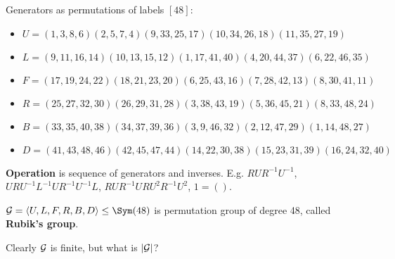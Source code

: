 \begin{slide}
    Generators as permutations of labels $[48]$:

    {\scriptsize
    \begin{itemize}
        \item $U = ( 1, 3, 8, 6)( 2, 5, 7, 4)( 9,33,25,17)(10,34,26,18)(11,35,27,19)$
        \item $L = ( 9,11,16,14)(10,13,15,12)( 1,17,41,40)( 4,20,44,37)( 6,22,46,35)$
        \item $F = (17,19,24,22)(18,21,23,20)( 6,25,43,16)( 7,28,42,13)( 8,30,41,11)$
        \item $R = (25,27,32,30)(26,29,31,28)( 3,38,43,19)( 5,36,45,21)( 8,33,48,24)$
        \item $B = (33,35,40,38)(34,37,39,36)( 3, 9,46,32)( 2,12,47,29)( 1,14,48,27)$
        \item $D = (41,43,48,46)(42,45,47,44)(14,22,30,38)(15,23,31,39)(16,24,32,40)$
    \end{itemize}} \pause

    \textbf{Operation} is sequence of generators and inverses. E.g. $RUR^{-1}U^{-1}$, \pause $URU^{-1}L^{-1}UR^{-1}U^{-1}L$, \pause $RUR^{-1}URU^2R^{-1}U^2$, \pause $1 = ()$.

    \begin{definition}
        \vspace{0pt}
        $\RC = \langle U,L,F,R,B,D \rangle \leq \Sym(48)$ is permutation group of degree 48, called \textbf{Rubik's group}.
    \end{definition}

    Clearly $\mathcal{G}$ is finite, but what is $|\mathcal{G}|$?
\end{slide}





